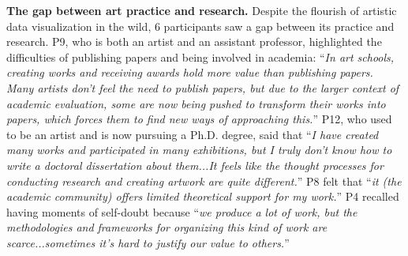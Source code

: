 \textbf{The gap between art practice and research.}
Despite the flourish of artistic data visualization in the wild, 6 participants saw a gap between its practice and research. P9, who is both an artist and an assistant professor, highlighted the difficulties of publishing papers and being involved in academia: ``\textit{In art schools, creating works and receiving awards hold more value than publishing papers. Many artists don’t feel the need to publish papers, but due to the larger context of academic evaluation, some are now being pushed to transform their works into papers, which forces them to find new ways of approaching this.}'' P12, who used to be an artist and is now pursuing a Ph.D. degree, said that ``\textit{I have created many works and participated in many exhibitions, but I truly don't know how to write a doctoral dissertation about them...It feels like the thought processes for conducting research and creating artwork are quite different.}''
P8 felt that ``\textit{it (the academic community) offers limited theoretical support for my work.}''
P4 recalled having moments of self-doubt because ``\textit{we produce a lot of work, but the methodologies and frameworks for organizing this kind of work are scarce...sometimes it's hard to justify our value to others.}''







